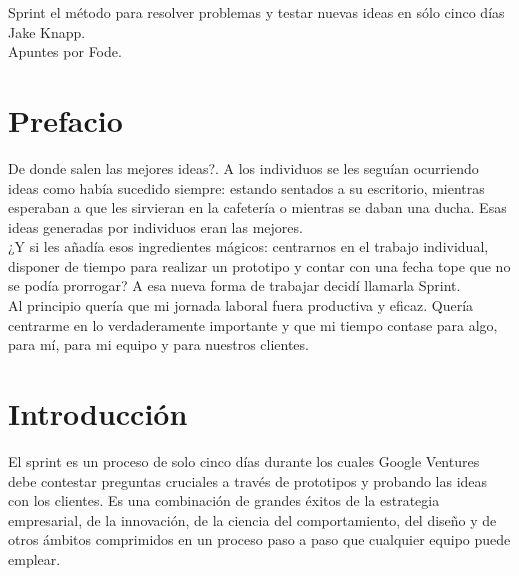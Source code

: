 \documentclass[10pt]{article}
\begin{document}
\begin{center}
\huge Sprint el método para resolver problemas y testar nuevas ideas en sólo cinco días\\
\vspace*{0.5cm}
\large Jake Knapp.\\
\vspace{1cm}
\Large Apuntes por Fode.
\vspace{1.5cm}
\end{center}

\section*{Prefacio}
De donde salen las mejores ideas?.
A los individuos se les seguían ocurriendo ideas como había sucedido siempre: estando sentados a su escritorio, mientras esperaban a que les sirvieran en la cafetería o mientras se daban una ducha. Esas ideas generadas por individuos eran las mejores.\\
¿Y si les añadía esos ingredientes mágicos: centrarnos en el trabajo individual, disponer de tiempo para realizar un prototipo y contar con una fecha tope que no se podía prorrogar? A esa nueva forma de trabajar decidí llamarla Sprint.\\
Al principio quería que mi jornada laboral fuera productiva y eficaz. Quería centrarme en lo verdaderamente importante y que mi tiempo contase para algo, para mí, para mi equipo y para nuestros clientes.
\section*{Introducción}
El sprint es un proceso de solo cinco días durante los cuales Google Ventures debe contestar preguntas cruciales a través de prototipos y probando las ideas con los clientes. Es una combinación de grandes éxitos de la estrategia empresarial, de la innovación, de la ciencia del comportamiento, del diseño y de otros ámbitos comprimidos en un proceso paso a paso que cualquier equipo puede emplear.\\
\end{document}

